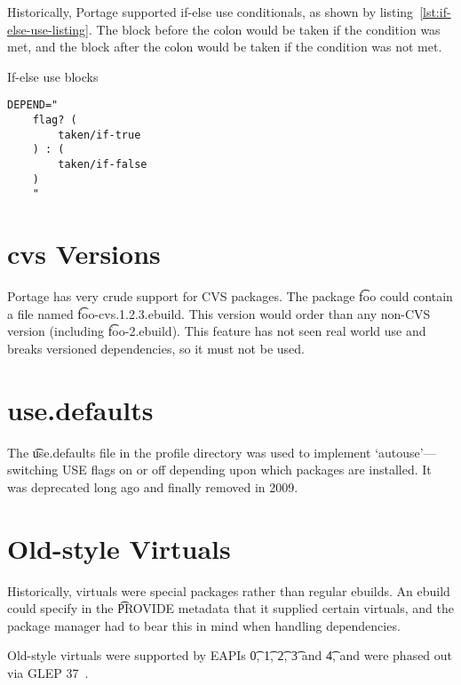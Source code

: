 Historically, Portage supported if-else use conditionals, as shown by
listing~\ref{lst:if-else-use-listing}. The block before the colon would be taken if the condition
was met, and the block after the colon would be taken if the condition was not met.

\begin{listing}
\caption{If-else use blocks} \label{lst:if-else-use-listing}
\begin{verbatim}
DEPEND="
    flag? (
        taken/if-true
    ) : (
        taken/if-false
    )
    "
\end{verbatim}
\end{listing}

\section{cvs Versions}

Portage has very crude support for CVS packages. The package \t{foo} could contain a file named
\t{foo-cvs.1.2.3.ebuild}. This version would order  than any non-CVS version (including
\t{foo-2.ebuild}). This feature has not seen real world use and breaks versioned dependencies, so
it must not be used.

\section{use.defaults}

The \t{use.defaults} file in the profile directory was used to implement `autouse'---switching USE
flags on or off depending upon which packages are installed. It was deprecated long ago and finally
removed in 2009.

\section{Old-style Virtuals}

Historically, virtuals were special packages rather than regular ebuilds. An ebuild could specify in
the \t{PROVIDE} metadata that it supplied certain virtuals, and the package manager had to bear this
in mind when handling dependencies.

Old-style virtuals were supported by EAPIs \t{0}, \t{1}, \t{2}, \t{3} and \t{4}, and were phased out
via GLEP 37~\cite{Glep37}.


